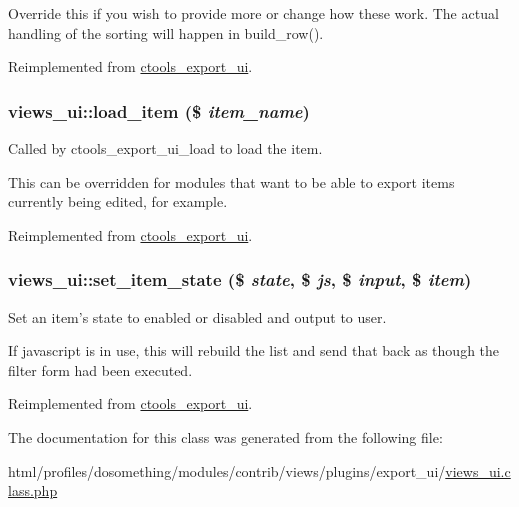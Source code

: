 Override this if you wish to provide more or change how these work. The actual handling of the sorting will happen in build\_\-row(). 

Reimplemented from \hyperlink{classctools__export__ui_ad9839b337e16e3c782eab7967550d3a1}{ctools\_\-export\_\-ui}.\hypertarget{classviews__ui_a214105ecb1527a6ccf712fd6ec3f4c0c}{
\subsubsection[{load\_\-item}]{\setlength{\rightskip}{0pt plus 5cm}views\_\-ui::load\_\-item (\$ {\em item\_\-name})}}
\label{classviews__ui_a214105ecb1527a6ccf712fd6ec3f4c0c}
Called by ctools\_\-export\_\-ui\_\-load to load the item.

This can be overridden for modules that want to be able to export items currently being edited, for example. 

Reimplemented from \hyperlink{classctools__export__ui_ab6ae2bbcbfa46949bd9fc14284bba061}{ctools\_\-export\_\-ui}.\hypertarget{classviews__ui_afd2f31ed4d97d797f8cb6d11e658545e}{
\subsubsection[{set\_\-item\_\-state}]{\setlength{\rightskip}{0pt plus 5cm}views\_\-ui::set\_\-item\_\-state (\$ {\em state}, \/  \$ {\em js}, \/  \$ {\em input}, \/  \$ {\em item})}}
\label{classviews__ui_afd2f31ed4d97d797f8cb6d11e658545e}
Set an item's state to enabled or disabled and output to user.

If javascript is in use, this will rebuild the list and send that back as though the filter form had been executed. 

Reimplemented from \hyperlink{classctools__export__ui_a60998d27b8d164122f1898a97a5666bf}{ctools\_\-export\_\-ui}.

The documentation for this class was generated from the following file:\begin{DoxyCompactItemize}
\item 
html/profiles/dosomething/modules/contrib/views/plugins/export\_\-ui/\hyperlink{views__ui_8class_8php}{views\_\-ui.class.php}\end{DoxyCompactItemize}
